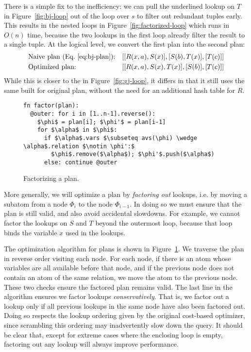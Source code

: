 There is a simple fix to the inefficiency: we can pull the underlined
lookup on $T$ in Figure~\ref{fig:bj-loop} out of the loop over $s$ to
filter out redundant tuples early.  This results in the nested loops
in Figure~\ref{fig:factorized-loop} which runs in $O(n)$ time, because
the two lookups in the first loop already filter the result to a
single tuple.  At the logical level, we convert the first \FJ plan
into the second \FJ plan:
%
\begin{align*}
   & \mbox{Naive plan (Eq.~\eqref{eq:bj-plan}):} &  & [[R(x, a), S(x)], [S(b), T(x)], [T(c)]] \\
   & \mbox{Optimized plan:}                      &  & [[R(x, a), S(x), T(x)], [S(b)], [T(c)]]
\end{align*}
%
While this is closer to the \GJ in Figure~\ref{fig:gj-loop}, it
differs in that it still uses the same \GHTs built for original
plan, without the need for an additional hash table for $R$.

\begin{figure}
  \begin{lstlisting}
fn factor(plan):
  @outer: for i in [1..n-1].reverse():
    $\phi$ = plan[i]; $\phi'$ = plan[i-1]
    for $\alpha$ in $\phi$:
      if $\alpha$.vars $\subseteq avs(\phi) \wedge \alpha$.relation $\notin \phi':$
        $\phi$.remove($\alpha$); $\phi'$.push($\alpha$)
      else: continue @outer
\end{lstlisting}
  \caption{Factorizing a \FJ plan.}
  \label{fig:factorize-plan}
\end{figure}

More generally, we will optimize a \FJ plan by \emph{factoring out}
lookups, i.e. by moving a subatom from a node $\Phi_i$ to the node
$\Phi_{i-1}$.  In doing so we must ensure that the plan is still
valid, and also avoid accidental slowdowns.  For example, we cannot
factor the lookups on $S$ and $T$ beyond the outermost loop, because
that loop binds the variable $x$ used in the lookups.

The optimization algorithm for \FJ plans is shown in
Figure~\ref{fig:factorize-plan}. We traverse the plan in reverse order
visiting each node. For each node, if there is an atom whose variables
are all available before that node, and if the previous node does not
contain an atom of the same relation, we move the atom to the previous
node. These two checks ensure the factored plan remains valid.  The
last line in the algorithm ensures we factor lookups
\emph{conservatively}. That is, we factor out a lookup only if all
previous lookups in the same node have also been factored out. Doing
so respects the lookup ordering given by the original cost-based
optimizer, since scrambling this ordering may inadvertently slow down
the query. It should be clear that, except for extreme cases where the
enclosing loop is empty, factoring out any lookup will always improve
performance.


